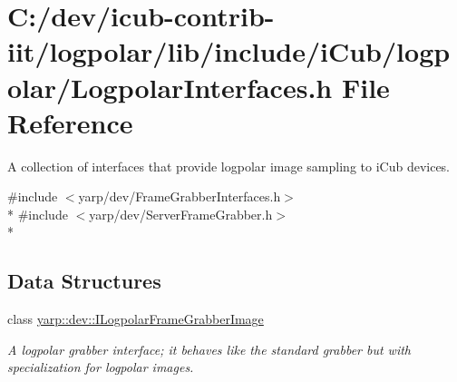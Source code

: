 \section{C\+:/dev/icub-\/contrib-\/iit/logpolar/lib/include/i\+Cub/logpolar/\+Logpolar\+Interfaces.h File Reference}
\label{LogpolarInterfaces_8h}


A collection of interfaces that provide logpolar image sampling to i\+Cub devices.  


{\ttfamily \#include $<$yarp/dev/\+Frame\+Grabber\+Interfaces.\+h$>$}\\*
{\ttfamily \#include $<$yarp/dev/\+Server\+Frame\+Grabber.\+h$>$}\\*
\subsection*{Data Structures}
\begin{DoxyCompactItemize}
\item 
class \hyperlink{classyarp_1_1dev_1_1ILogpolarFrameGrabberImage}{yarp\+::dev\+::\+I\+Logpolar\+Frame\+Grabber\+Image}
\begin{DoxyCompactList}\small\item\em A logpolar grabber interface; it behaves like the standard grabber but with specialization for logpolar images. \end{DoxyCompactList}\end{DoxyCompactItemize}
